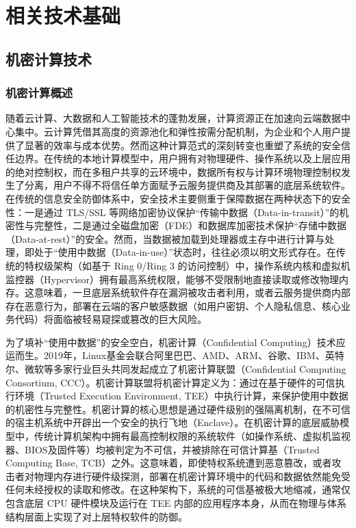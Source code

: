 \chapter{相关技术基础}

\section{机密计算技术}

\subsection{机密计算概述}
随着云计算、大数据和人工智能技术的蓬勃发展，计算资源正在加速向云端数据中心集中。云计算凭借其高度的资源池化和弹性按需分配机制，为企业和个人用户提供了显著的效率与成本优势。然而这种计算范式的深刻转变也重塑了系统的安全信任边界。在传统的本地计算模型中，用户拥有对物理硬件、操作系统以及上层应用的绝对控制权，而在多租户共享的云环境中，数据所有权与计算环境物理控制权发生了分离，用户不得不将信任单方面赋予云服务提供商及其部署的底层系统软件。在传统的信息安全防御体系中，安全技术主要侧重于保障数据在两种状态下的安全性：一是通过 TLS/SSL 等网络加密协议保护“传输中数据（Data-in-transit）”的机密性与完整性，二是通过全磁盘加密（FDE）和数据库加密技术保护“存储中数据（Data-at-rest）”的安全。然而，当数据被加载到处理器或主存中进行计算与处理，即处于“使用中数据（Data-in-use）”状态时，往往必须以明文形式存在。在传统的特权级架构（如基于 Ring 0/Ring 3 的访问控制）中，操作系统内核和虚拟机监控器（Hypervisor）拥有最高系统权限，能够不受限制地直接读取或修改物理内存。这意味着，一旦底层系统软件存在漏洞被攻击者利用，或者云服务提供商内部存在恶意行为，部署在云端的客户敏感数据（如用户密钥、个人隐私信息、核心业务代码）将面临被轻易窥探或篡改的巨大风险。

为了填补“使用中数据”的安全空白，机密计算（Confidential Computing）技术应运而生。2019年，Linux基金会联合阿里巴巴、AMD、ARM、谷歌、IBM、英特尔、微软等多家行业巨头共同发起成立了机密计算联盟（Confidential Computing Consortium, CCC）。机密计算联盟将机密计算定义为：通过在基于硬件的可信执行环境（Trusted Execution Environment, TEE）中执行计算，来保护使用中数据的机密性与完整性\cite{ccc_whitepaper}。机密计算的核心思想是通过硬件级别的强隔离机制，在不可信的宿主机系统中开辟出一个安全的执行飞地（Enclave）\cite{sabt2015trusted}。在机密计算的底层威胁模型中，传统计算机架构中拥有最高控制权限的系统软件（如操作系统、虚拟机监视器、BIOS及固件等）均被判定为不可信，并被排除在可信计算基（Trusted Computing Base, TCB）之外。这意味着，即使特权系统遭到恶意篡改，或者攻击者对物理内存进行硬件级探测，部署在机密计算环境中的代码和数据依然能免受任何未经授权的读取和修改。在这种架构下，系统的可信基被极大地缩减，通常仅包含底层 CPU 硬件模块及运行在 TEE 内部的应用程序本身，从而在物理与体系结构层面上实现了对上层特权软件的防御。

